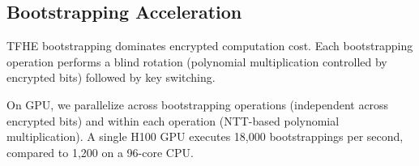 \subsection{Bootstrapping Acceleration}

TFHE bootstrapping dominates encrypted computation cost. Each bootstrapping
operation performs a blind rotation (polynomial multiplication controlled by
encrypted bits) followed by key switching.

On GPU, we parallelize across bootstrapping operations (independent across
encrypted bits) and within each operation (NTT-based polynomial multiplication).
A single H100 GPU executes 18,000 bootstrappings per second, compared to 1,200
on a 96-core CPU.

